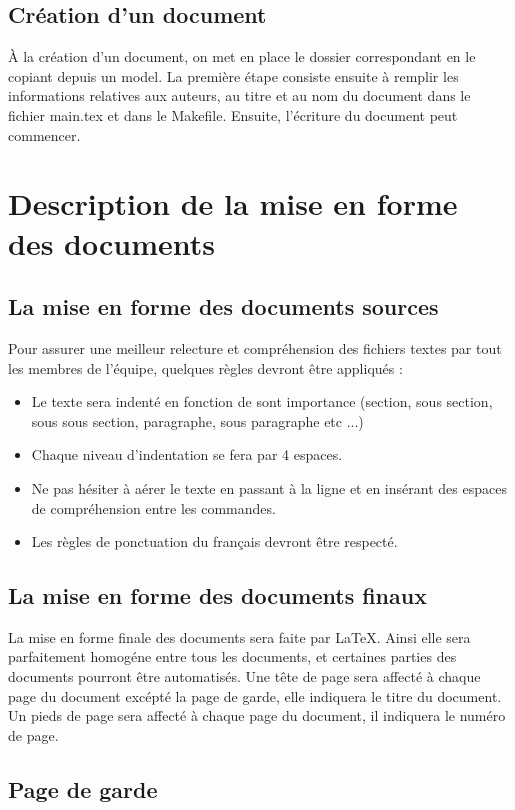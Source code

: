 \subsection{Création d'un document}

\`A la création d'un document, on met en place le dossier correspondant en le copiant depuis un model.
La première étape consiste ensuite à remplir les informations relatives aux auteurs, au titre et au nom du document dans le fichier main.tex et dans le Makefile.
Ensuite, l'écriture du document peut commencer.

\section{Description de la mise en forme des documents}

\subsection{La mise en forme des documents sources}
    Pour assurer une meilleur relecture et compréhension des fichiers textes par tout les membres de l'équipe, quelques règles devront être appliqués :
    \begin{itemize}
        \item Le texte sera indenté en fonction de sont importance (section, sous section, sous sous section, paragraphe, sous paragraphe etc ...)
        \item Chaque niveau d'indentation se fera par 4 espaces.
        \item Ne pas hésiter à aérer le texte en passant à la ligne et en insérant des espaces de compréhension entre les commandes.
        \item Les règles de ponctuation du français devront être respecté.
    \end{itemize}

\subsection{La mise en forme des documents finaux}
La mise en forme finale des documents sera faite par LaTeX.
Ainsi elle sera parfaitement homogéne entre tous les documents, et certaines parties des documents pourront être automatisés.
Une tête de page sera affecté à chaque page du document excépté la page de garde, elle indiquera le titre du document.
Un pieds de page sera affecté à chaque page du document, il indiquera le numéro de page.

\subsection{Page de garde}


